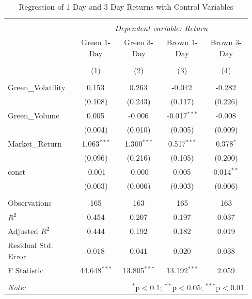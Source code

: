 \begin{table}[!htbp] \centering
  \caption{Regression of 1-Day and 3-Day Returns with Control Variables}
\begin{tabular}{@{\extracolsep{5pt}}lcccc}
\\[-1.8ex]\hline
\hline \\[-1.8ex]
& \multicolumn{4}{c}{\textit{Dependent variable: Return}} \
\cr \cline{2-5}
\\[-1.8ex] & \multicolumn{1}{c}{Green 1-Day} & \multicolumn{1}{c}{Green 3-Day} & \multicolumn{1}{c}{Brown 1-Day} & \multicolumn{1}{c}{Brown 3-Day}  \\
\\[-1.8ex] & (1) & (2) & (3) & (4) \\
\hline \\[-1.8ex]
 Green_Volatility & 0.153$^{}$ & 0.263$^{}$ & -0.042$^{}$ & -0.282$^{}$ \\
& (0.108) & (0.243) & (0.117) & (0.226) \\
 Green_Volume & 0.005$^{}$ & -0.006$^{}$ & -0.017$^{***}$ & -0.008$^{}$ \\
& (0.004) & (0.010) & (0.005) & (0.009) \\
 Market_Return & 1.063$^{***}$ & 1.300$^{***}$ & 0.517$^{***}$ & 0.378$^{*}$ \\
& (0.096) & (0.216) & (0.105) & (0.200) \\
 const & -0.001$^{}$ & -0.000$^{}$ & 0.005$^{}$ & 0.014$^{**}$ \\
& (0.003) & (0.006) & (0.003) & (0.006) \\
\hline \\[-1.8ex]
 Observations & 165 & 163 & 165 & 163 \\
 $R^2$ & 0.454 & 0.207 & 0.197 & 0.037 \\
 Adjusted $R^2$ & 0.444 & 0.192 & 0.182 & 0.019 \\
 Residual Std. Error & 0.018 & 0.041 & 0.020 & 0.038 \\
 F Statistic & 44.648$^{***}$ & 13.805$^{***}$ & 13.192$^{***}$ & 2.059$^{}$ \\
\hline
\hline \\[-1.8ex]
\textit{Note:} & \multicolumn{4}{r}{$^{*}$p$<$0.1; $^{**}$p$<$0.05; $^{***}$p$<$0.01} \\
\end{tabular}
\end{table}